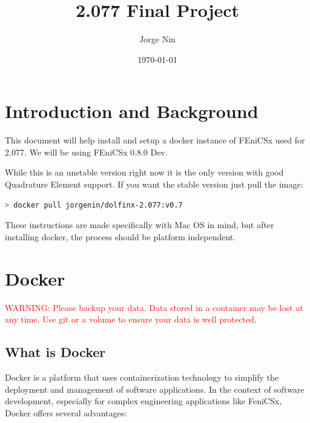 \documentclass[final]{article}
\title{2.077 Final Project}
\author{Jorge Nin}
\date{\today}
\numberwithin{equation}{section}
\theoremstyle{remarkStyle}
\begin{document}
\maketitle
\thispagestyle{empty}
\pagebreak
\tableofcontents
\pagebreak
\section{Introduction and Background}

This document will help install and setup a docker instance of FEniCSx used for 2.077.
We will be using FEniCSx 0.8.0 Dev.


While this is an unstable version right now it is the only version with good Quadrature Element support.
If you want the stable version just pull the image:

\begin{lstlisting}[language=bash, caption=Docker Pull Command]
  > docker pull jorgenin/dolfinx-2.077:v0.7
\end{lstlisting}


These instructions are made specifically with Mac OS in mind, but after installing docker, the process should be platform independent.











\section{Docker}

 {\LARGE \textcolor{red}{WARNING: Please backup your data. Data stored in a container may be lost at any time. Use git or a volume to ensure your data is well protected.}}


\subsection{What is Docker}

Docker is a platform that uses containerization technology to simplify
the deployment and management of software applications. In the context of
software development, especially for complex engineering applications like FeniCSx,
Docker offers several advantages:
\end{document}
